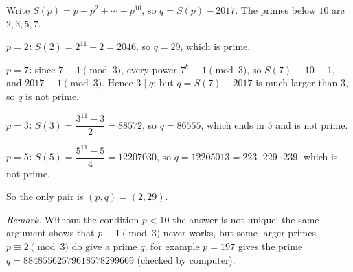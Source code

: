 Write $S(p)=p+p^2+\cdots+p^{10}$, so $q=S(p)-2017$. The primes below $10$ are $2,3,5,7$.

\textbf{$p=2$:} $S(2)=2^{11}-2=2046$, so $q=29$, which is prime.

\textbf{$p=7$:} since $7\equiv1\pmod3$, every power $7^k\equiv1\pmod 3$, so $S(7)\equiv10\equiv1$, and $2017\equiv1\pmod3$. Hence $3\mid q$; but $q=S(7)-2017$ is much larger than $3$, so $q$ is not prime.

\textbf{$p=3$:} $S(3)=\dfrac{3^{11}-3}{2}=88572$, so $q=86555$, which ends in $5$ and is not prime.

\textbf{$p=5$:} $S(5)=\dfrac{5^{11}-5}{4}=12207030$, so $q=12205013=223\cdot229\cdot239$, which is not prime.

So the only pair is $\boxed{(p,q)=(2,29)}$.

\emph{Remark.} Without the condition $p<10$ the answer is not unique: the same argument shows that $p\equiv1\pmod3$ never works, but some larger primes $p\equiv2\pmod 3$ do give a prime $q$; for example $p=197$ gives the prime $q=88485562579618578299669$ (checked by computer).
